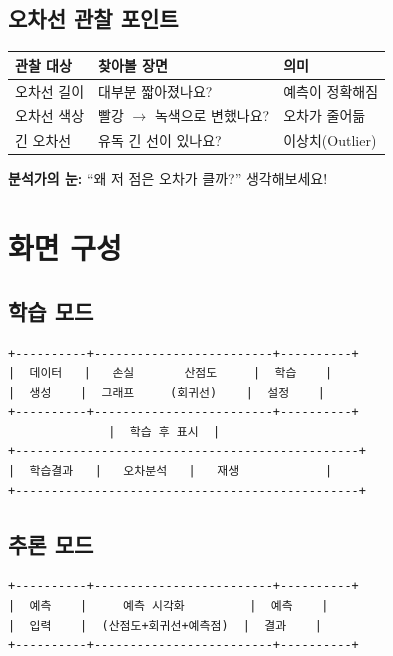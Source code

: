 \documentclass[11pt, a4paper]{article}
\begin{document}
\subsection{오차선 관찰 포인트}

\begin{center}
\begin{tabular}{lp{6cm}l}
    \toprule
    \textbf{관찰 대상} & \textbf{찾아볼 장면} & \textbf{의미} \\
    \midrule
    오차선 길이 & 대부분 짧아졌나요? & 예측이 정확해짐 \\
    오차선 색상 & 빨강 $\rightarrow$ 녹색으로 변했나요? & 오차가 줄어듦 \\
    긴 오차선 & 유독 긴 선이 있나요? & 이상치(Outlier) \\
    \bottomrule
\end{tabular}
\end{center}

\begin{tipbox}
\textbf{분석가의 눈:} ``왜 저 점은 오차가 클까?'' 생각해보세요!
\end{tipbox}

\section{화면 구성}

\subsection{학습 모드}

\begin{lstlisting}
+----------+-------------------------+----------+
|  데이터   |   손실       산점도     |  학습    |
|  생성    |  그래프     (회귀선)    |  설정    |
+----------+-------------------------+----------+
              |  학습 후 표시  |
+------------------------------------------------+
|  학습결과   |   오차분석   |   재생            |
+------------------------------------------------+
\end{lstlisting}

\subsection{추론 모드}

\begin{lstlisting}
+----------+-------------------------+----------+
|  예측    |     예측 시각화         |  예측    |
|  입력    |  (산점도+회귀선+예측점)  |  결과    |
+----------+-------------------------+----------+
\end{lstlisting}
\end{document}
